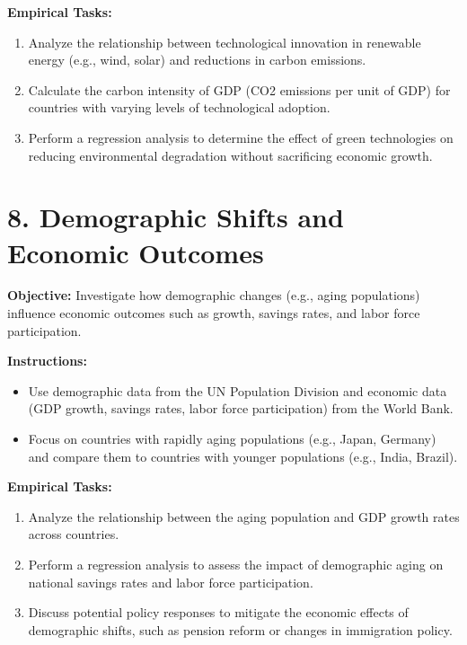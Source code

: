 \documentclass{article}
\begin{document}
\textbf{Empirical Tasks:}
\begin{enumerate}
    \item Analyze the relationship between technological innovation in renewable energy (e.g., wind, solar) and reductions in carbon emissions.
    \item Calculate the carbon intensity of GDP (CO2 emissions per unit of GDP) for countries with varying levels of technological adoption.
    \item Perform a regression analysis to determine the effect of green technologies on reducing environmental degradation without sacrificing economic growth.
\end{enumerate}

\section*{8. Demographic Shifts and Economic Outcomes}
\textbf{Objective:} Investigate how demographic changes (e.g., aging populations) influence economic outcomes such as growth, savings rates, and labor force participation.

\textbf{Instructions:}
\begin{itemize}
    \item Use demographic data from the UN Population Division and economic data (GDP growth, savings rates, labor force participation) from the World Bank.
    \item Focus on countries with rapidly aging populations (e.g., Japan, Germany) and compare them to countries with younger populations (e.g., India, Brazil).
\end{itemize}

\textbf{Empirical Tasks:}
\begin{enumerate}
    \item Analyze the relationship between the aging population and GDP growth rates across countries.
    \item Perform a regression analysis to assess the impact of demographic aging on national savings rates and labor force participation.
    \item Discuss potential policy responses to mitigate the economic effects of demographic shifts, such as pension reform or changes in immigration policy.
\end{enumerate}
\end{document}
